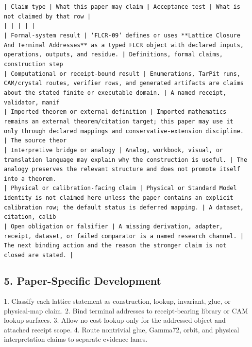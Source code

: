 \documentclass[11pt]{article}
\begin{document}
\noindent\texttt{| Claim type | What this paper may claim | Acceptance test | What is not claimed by that row |}\\
\noindent\texttt{|---|---|---|---|}\\
\noindent\texttt{| Formal-system result | `FLCR-09` defines or uses **Lattice Closure And Terminal Addresses** as a typed FLCR object with declared inputs, operations, outputs, and residue. | Definitions, formal claims, construction step}\\
\noindent\texttt{| Computational or receipt-bound result | Enumerations, TarPit runs, CAM/crystal routes, verifier rows, and generated artifacts are claims about the stated finite or executable domain. | A named receipt, validator, manif}\\
\noindent\texttt{| Imported theorem or external definition | Imported mathematics remains an external theorem/citation target; this paper may use it only through declared mappings and conservative-extension discipline. | The source theor}\\
\noindent\texttt{| Interpretive bridge or analogy | Analog, workbook, visual, or translation language may explain why the construction is useful. | The analogy preserves the relevant structure and does not promote itself into a theorem. }\\
\noindent\texttt{| Physical or calibration-facing claim | Physical or Standard Model identity is not claimed here unless the paper contains an explicit calibration row; the default status is deferred mapping. | A dataset, citation, calib}\\
\noindent\texttt{| Open obligation or falsifier | A missing derivation, adapter, receipt, dataset, or failed comparator is a named research channel. | The next binding action and the reason the stronger claim is not closed are stated. | }\\

\subsection*{5. Paper-Specific Development}

1. Classify each lattice statement as construction, lookup, invariant, glue, or physical-map claim.
2. Bind terminal addresses to receipt-bearing library or CAM lookup surfaces.
3. Allow no-cost lookup only for the addressed object and attached receipt scope.
4. Route nontrivial glue, Gamma72, orbit, and physical interpretation claims to separate evidence lanes.
\end{document}
